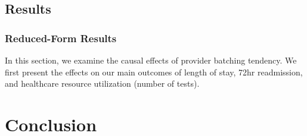 \documentclass[,,nonblindrev]{informs}
\begin{document}
\hypertarget{results}{%
\subsection{Results}\label{results}}

\hypertarget{reduced-form-results}{%
\subsubsection{Reduced-Form Results}\label{reduced-form-results}}

In this section, we examine the causal effects of provider batching
tendency. We first present the effects on our main outcomes of length of
stay, 72hr readmission, and healthcare resource utilization (number of
tests).

\hypertarget{conclusion}{%
\section{Conclusion}\label{conclusion}}

\clearpage
\end{document}

